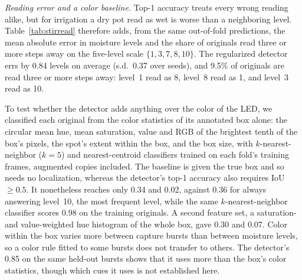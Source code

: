 ﻿\documentclass[journal]{IEEEtran}
\begin{document}
\emph{Reading error and a color baseline.} Top-1 accuracy treats every wrong reading alike, but for irrigation a dry pot read as wet is worse than a neighboring level. Table~\ref{tab:stirread} therefore adds, from the same out-of-fold predictions, the mean absolute error in moisture levels and the share of originals read three or more steps away on the five-level scale $\{1, 3, 7, 8, 10\}$. The regularized detector errs by 0.84 levels on average (s.d.\ 0.37 over seeds), and 9.5\% of originals are read three or more steps away: level~1 read as 8, level~8 read as 1, and level~3 read as 10.

To test whether the detector adds anything over the color of the LED, we classified each original from the color statistics of its annotated box alone: the circular mean hue, mean saturation, value and RGB of the brightest tenth of the box's pixels, the spot's extent within the box, and the box size, with $k$-nearest-neighbor ($k = 5$) and nearest-centroid classifiers trained on each fold's training frames, augmented copies included. The baseline is given the true box and so needs no localization, whereas the detector's top-1 accuracy also requires IoU~$\geq 0.5$. It nonetheless reaches only 0.34 and 0.02, against 0.36 for always answering level~10, the most frequent level, while the same $k$-nearest-neighbor classifier scores 0.98 on the training originals. A second feature set, a saturation- and value-weighted hue histogram of the whole box, gave 0.30 and 0.07. Color within the box varies more between capture bursts than between moisture levels, so a color rule fitted to some bursts does not transfer to others. The detector's 0.85 on the same held-out bursts shows that it uses more than the box's color statistics, though which cues it uses is not established here.
\end{document}

